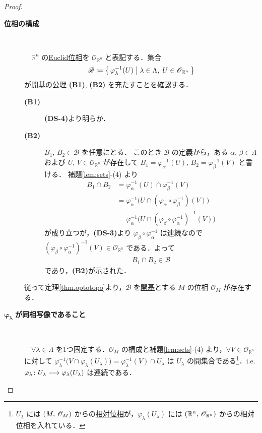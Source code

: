 \documentclass[geometry_main]{subfiles}
\begin{document}
\begin{proof}
	\begin{description}
		\item[\textbf{位相の構成}]　
		
		　$\mathbb{R}^n$ の\hyperref[thm.metrictopo]{Euclid位相}を $\mathscr{O}_{\mathbb{R}^n}$ と表記する．集合
		\begin{align}
			\mathscr{B} \coloneqq \bigl\{\, \varphi_\lambda^{-1}(U) \bigm| \lambda \in \Lambda,\; U \in \mathscr{O}_{\mathbb{R}^n} \,\bigr\} 
		\end{align}
		が\hyperref[ax.opbase]{開基の公理} \textsf{\textbf{(B1)}}, \textsf{\textbf{(B2)}} を充たすことを確認する．
		\begin{description}
			\item[\textbf{(B1)}] \textsf{\textbf{(DS-4)}}より明らか．
			\item[\textbf{(B2)}] $B_1,\, B_2 \in \mathscr{B}$ を任意にとる．
			このとき $\mathscr{B}$ の定義から，ある $\alpha,\, \beta \in \Lambda$ および $U,\, V \in \mathscr{O}_{\mathbb{R}^n}$ が存在して $B_1 = \varphi_\alpha^{-1}(U),\, B_2 = \varphi_\beta^{-1}(V)$ と書ける．
			補題\ref{lem:sets}-(4) より
			\begin{align}
				B_1 \cap B_2 &= \varphi_\alpha^{-1}(U) \cap \varphi_\beta^{-1}(V) \\
				&= \varphi_\alpha^{-1} \bigl( U \cap (\varphi_\alpha \circ \varphi_\beta^{-1})(V) \bigr) \\
				&= \varphi_\alpha^{-1} \bigl( U \cap (\varphi_\beta \circ \varphi_\alpha^{-1})^{-1}(V) \bigr)
			\end{align}
			が成り立つが，\textsf{\textbf{(DS-3)}}より $\varphi_\beta \circ \varphi_\alpha^{-1}$ は連続なので $(\varphi_\beta \circ \varphi_\alpha^{-1})^{-1}(V) \in \mathscr{O}_{\mathbb{R}^n}$ である．よって
			\begin{align}
				B_1 \cap B_2 \in \mathscr{B}
			\end{align}
			であり，\textsf{\textbf{(B2)}}が示された．
		\end{description}
		従って定理\ref{thm.optotopo}より，$\mathscr{B}$ を\hyperref[def.opbase]{開基}とする $M$ の位相 $\mathscr{O}_M$ が存在する．
		\item[$\bm{\varphi_\lambda}$ \textbf{が同相写像であること}]　
		
		　$\forall \lambda \in \Lambda$ を1つ固定する．$\mathscr{O}_M$ の構成と補題\ref{lem:sets}-(4) より，$\forall V \in \mathscr{O}_{\mathbb{R}^n}$ に対して
		$\varphi_\lambda^{-1}\bigl( V \cap \varphi_\lambda(U_\lambda) \bigr) = \varphi_\lambda^{-1}(V) \cap U_\lambda$ は $U_\lambda$ の開集合である\footnote{$U_\lambda$ には $(M,\, \mathscr{O}_{M})$ からの\hyperref[def.reltopo]{相対位相}が，$\varphi_\lambda(U_\lambda)$ には $(\mathbb{R}^n,\, \mathscr{O}_{\mathbb{R}^n})$ からの相対位相を入れている．}．i.e. $\varphi_\lambda \colon U_\lambda \longrightarrow \varphi_\lambda(U_\lambda)$ は連続である．
		

\end{description}
\end{proof}
\end{document}
